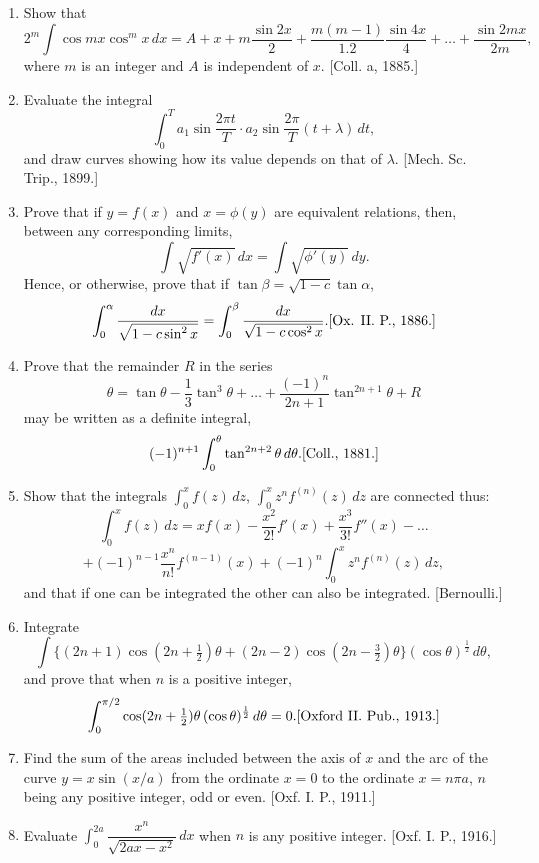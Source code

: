 \documentclass[11pt, a4paper]{article}
\newcommand{\source}[1]{\hfill\textnormal{[#1]}}
\begin{document}
\begin{enumerate}[leftmargin=2em]
\item Show that
\[
2^m\int \cos mx\cos^mx\,dx = A+x+m\dfrac{\sin 2x}{2}+\dfrac{m(m-1)}{1.2}\dfrac{\sin 4x}{4}+\dots+\dfrac{\sin 2mx}{2m},
\]
where $m$ is an integer and $A$ is independent of $x$. \source{Coll. a, 1885.}

\item Evaluate the integral
\[
\int_0^T a_1\sin\dfrac{2\pi t}{T}\cdot a_2\sin\dfrac{2\pi}{T}(t+\lambda)\,dt,
\]
and draw curves showing how its value depends on that of $\lambda$. \source{Mech. Sc. Trip., 1899.}

\item Prove that if $y=f(x)$ and $x=\phi(y)$ are equivalent relations, then, between any corresponding limits,
\[
\int\sqrt{f'(x)}\,dx = \int\sqrt{\phi'(y)}\,dy.
\]
Hence, or otherwise, prove that if $\tan\beta=\sqrt{1-c}\tan\alpha$,
\[
\int_0^\alpha \dfrac{dx}{\sqrt{1-c\sin^2x}} = \int_0^\beta \dfrac{dx}{\sqrt{1-c\cos^2x}}. \source{Ox. II. P., 1886.}
\]

\item Prove that the remainder $R$ in the series
\[
\theta = \tan\theta-\dfrac13\tan^3\theta+\dots+\dfrac{(-1)^n}{2n+1}\tan^{2n+1}\theta+R
\]
may be written as a definite integral,
\[
(-1)^{n+1}\int_0^\theta \tan^{2n+2}\theta\,d\theta. \source{Coll., 1881.}
\]

\item Show that the integrals $\displaystyle\int_0^x f(z)\,dz$, $\displaystyle\int_0^x z^nf^{(n)}(z)\,dz$ are connected thus:
\[
\int_0^x f(z)\,dz = xf(x)-\dfrac{x^2}{2!}f'(x)+\dfrac{x^3}{3!}f''(x)-\dots
\]
\[
+(-1)^{n-1}\dfrac{x^n}{n!}f^{(n-1)}(x)+(-1)^n\int_0^x z^nf^{(n)}(z)\,dz,
\]
and that if one can be integrated the other can also be integrated. \source{Bernoulli.}

\item Integrate
\[
\int\{(2n+1)\cos(2n+\tfrac12)\theta+(2n-2)\cos(2n-\tfrac32)\theta\}(\cos\theta)^{\frac12}\,d\theta,
\]
and prove that when $n$ is a positive integer,
\[
\int_0^{\pi/2}\cos(2n+\tfrac12)\theta\,(\cos\theta)^{\frac12}\,d\theta = 0. \source{Oxford II. Pub., 1913.}
\]

\item Find the sum of the areas included between the axis of $x$ and the arc of the curve $y=x\sin(x/a)$ from the ordinate $x=0$ to the ordinate $x=n\pi a$, $n$ being any positive integer, odd or even. \source{Oxf. I. P., 1911.}

\item Evaluate $\displaystyle\int_0^{2a}\dfrac{x^n}{\sqrt{2ax-x^2}}\,dx$ when $n$ is any positive integer. \source{Oxf. I. P., 1916.}


\end{enumerate}
\end{document}
